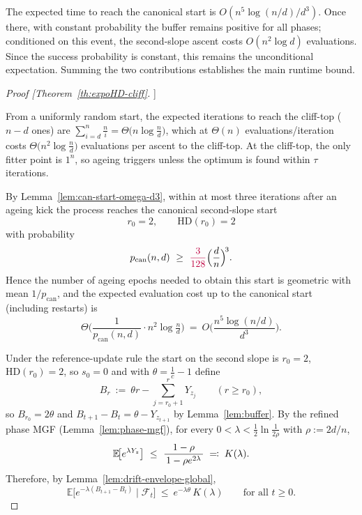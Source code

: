 \documentclass[lettersize,journal]{IEEEtran}
\newcommand{\rerev}[1]{\textcolor{purple}{#1}}
\newcommand{\EE}{\mathbb{E}}
\newcommand{\HD}{\text{HD}}
\begin{document}
{The expected time to reach the canonical start is 
$O(n^{5}\log(n/d)/d^{3})$.  
Once there, with constant probability the buffer remains positive for all 
phases; conditioned on this event, the second-slope ascent costs 
$O(n^{2}\log d)$ evaluations.  
Since the success probability is constant, this remains the unconditional 
expectation.  
Summing the two contributions establishes the main runtime bound.

\begin{proof}[Proof [Theorem~\ref{th:expoHD-cliff}]]
	
	From a uniformly random start, the expected iterations to reach the cliff-top ($n-d$ ones) are
	$\sum_{i=d}^{n}\frac{n}{i}=\Theta\!\big(n\log\tfrac{n}{d}\big)$, which at $\Theta(n)$ evaluations/iteration costs
	$\Theta\!\big(n^{2}\log\tfrac{n}{d}\big)$ evaluations per ascent to the cliff-top. At the cliff-top, the only fitter point is $1^n$, so ageing triggers unless the optimum is found within $\tau$ iterations.
	
	By Lemma~\ref{lem:can-start-omega-d3}, within at most three iterations after an ageing kick the process reaches the canonical second-slope start
	\[
	r_0=2,\qquad \HD(r_0)=2
	\]
	with probability
	\[
	p_{\mathrm{can}}(n,d)\ \ge\ \rerev{\frac{3}{128}}\Big(\frac{d}{n}\Big)^{\!3}.
	\]
	Hence the number of ageing epochs needed to obtain this start is geometric with mean $1/p_{\mathrm{can}}$, and the expected evaluation cost up to the canonical start (including restarts) is
	\[
	\Theta\!\Big(\frac{1}{p_{\mathrm{can}}(n,d)}\cdot n^{2}\log\tfrac{n}{d}\Big)
	\ =\ O\!\Big(\frac{n^{5}\log(n/d)}{d^{3}}\Big).
	\]
	
	\smallskip
	Under the reference-update rule the start on the second slope is $r_0=2$, $\HD(r_0)=2$, so $s_0=0$ and with $\theta=\tfrac1c-1$ define
	\[
	B_r\ :=\ \theta r - \sum_{j=r_0+1}^{r} Y_{z_j}\qquad(r\ge r_0),
	\]
	so $B_{r_0}=2\theta$ and $B_{t+1}-B_t=\theta-Y_{z_{t+1}}$ by Lemma~\ref{lem:buffer}.
	By the refined phase MGF (Lemma~\ref{lem:phase-mgf}), for every $0<\lambda<\tfrac12\ln\!\tfrac{1}{2\rho}$ with $\rho:=2d/n$,
	\[
	\textcolor{black}{\EE\!\big[e^{\lambda Y_z}\big]\ \le\ \frac{1-\rho}{\,1-\rho e^{2\lambda}\,} \;\eqqcolon\; K(\lambda).}
	\]
	Therefore, by Lemma~\ref{lem:drift-envelope-global},
	\[
	\EE\!\big[e^{-\lambda(B_{t+1}-B_t)}\mid\mathcal F_t\big]\ \le\ e^{-\lambda\theta}\,K(\lambda)\qquad\text{for all }t\ge 0.
	\]
	

\end{proof}}
\end{document}
